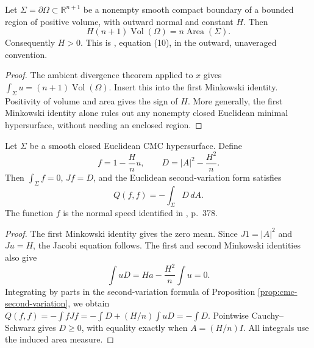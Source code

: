 \begin{proposition}\label{prop:cmc-area-volume-balance}
Let $\Sigma=\partial\Omega\subset\mathbb R^{n+1}$ be a nonempty smooth compact boundary of a bounded region of positive volume, with outward normal and constant $H$. Then
\[
 H(n+1)\operatorname{Vol}(\Omega)=n\operatorname{Area}(\Sigma).
\]
Consequently $H>0$. This is \cite{Wen91}, equation (10), in the outward, unaveraged convention.
\end{proposition}
\begin{proof}
The ambient divergence theorem applied to $x$ gives $\int_\Sigma u=(n+1)\operatorname{Vol}(\Omega)$. Insert this into the first Minkowski identity. Positivity of volume and area gives the sign of $H$. More generally, the first Minkowski identity alone rules out any nonempty closed Euclidean minimal hypersurface, without needing an enclosed region.
\end{proof}

\begin{proposition}\label{prop:cmc-umbilicity-test}
Let $\Sigma$ be a smooth closed Euclidean CMC hypersurface. Define
\[
 f=1-\frac Hn u,\qquad D=|A|^2-\frac{H^2}{n}.
\]
Then $\int_\Sigma f=0$, $Jf=D$, and the Euclidean second-variation form satisfies
\[
 Q(f,f)=-\int_\Sigma D\,dA.
\]
The function $f$ is the normal speed identified in \cite{Wen91}, p.~378.
\end{proposition}
\begin{proof}
The first Minkowski identity gives the zero mean. Since $J1=|A|^2$ and $Ju=H$, the Jacobi equation follows. The first and second Minkowski identities also give
\[
 \int uD=Ha-\frac{H^2}{n}\int u=0.
\]
Integrating by parts in the second-variation formula of Proposition \ref{prop:cmc-second-variation}, we obtain
$Q(f,f)=-\int fJf=-\int D+(H/n)\int uD=-\int D$.
Pointwise Cauchy--Schwarz gives $D\geq0$, with equality exactly when $A=(H/n)I$. All integrals use the induced area measure.
\end{proof}

